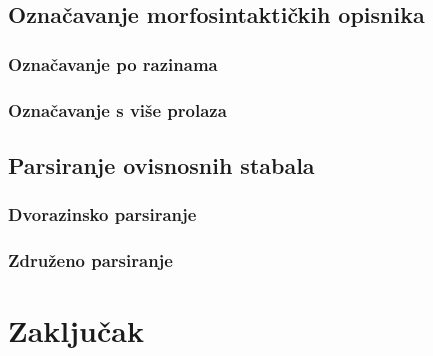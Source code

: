 \documentclass[times, utf8, diplomski]{fer}
\begin{document}
\section{Označavanje morfosintaktičkih opisnika}

\subsection{Označavanje po razinama}

\subsection{Označavanje s više prolaza}

\section{Parsiranje ovisnosnih stabala}

\subsection{Dvorazinsko parsiranje}

\subsection{Združeno parsiranje}

\chapter{Zaključak}








\nocite{daume06thesis}
\nocite{daume09searn}
\nocite{daume06searn-practice}
\nocite{daume15reductions}
\nocite{daume15lols}
\nocite{daume15rewrite}
\nocite{daume14lts}
\end{document}
